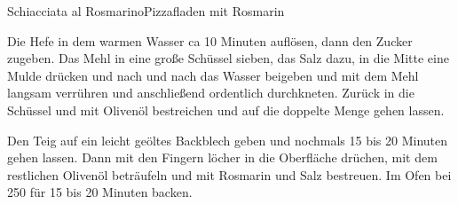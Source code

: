 \begin{recipe}{Schiacciata al Rosmarino}{Pizzafladen mit Rosmarin}
  \label{Schiacciata al Rosmarino}
  \inglist

  \steps
  Die Hefe in dem warmen Wasser ca 10 Minuten auflösen, dann den Zucker zugeben. Das Mehl
  in eine große Schüssel sieben, das Salz dazu, in die Mitte eine Mulde drücken und nach
  und nach das Wasser beigeben und mit dem Mehl langsam verrühren und anschließend
  ordentlich durchkneten. Zurück in die Schüssel und mit Olivenöl bestreichen und auf die
  doppelte Menge gehen lassen.

  Den Teig auf ein leicht geöltes Backblech geben und nochmals 15 bis 20 Minuten gehen
  lassen. Dann mit den Fingern löcher in die Oberfläche drüchen, mit dem restlichen
  Olivenöl beträufeln und mit Rosmarin und Salz bestreuen. Im Ofen bei 250 \celsius für
  15 bis 20 Minuten backen.
\end{recipe}
